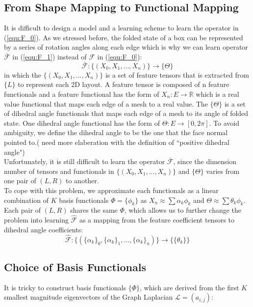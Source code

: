 \subsection{From Shape Mapping to Functional Mapping}
It is difficult to design a model and a learning scheme to learn the operator in (\ref{equ:F_0}). As we stressed before, the folded state of a box can be represented by a series of rotation angles along each edge which is why we can learn operator $\mathcal{\bar{F}}$ in (\ref{equ:F_1}) instead of $\mathcal{F}$ in (\ref{equ:F_0}):
\begin{equation}
\mathcal{\bar{F}}:\{(X_0,X_1,...,X_n)\}\rightarrow\{\Theta\}
\label{equ:F_1}
\end{equation}
in which the $\{(X_0,X_1,...,X_n)\}$ is a set of feature tensors that is extracted from $\{L\}$ to represent each 2D layout. A feature tensor is composed of n feature functionals and a feature functional has the form of $X_n:E\rightarrow\mathbb{R}$ which is a real value functional that maps each edge of a mesh to a real value. The $\{\Theta\}$ is a set of dihedral angle functionals that maps each edge of a mesh to its angle of folded state. One dihedral angle functional has the form of $\Theta:E\rightarrow [0,2\pi]$. To avoid ambiguity, we define the dihedral angle to be the one that the face normal pointed to.({\color{red} {need more elaberation with the definition of ``positive dihedral angle"}})\\
Unfortunately, it is still difficult to learn the operator $\mathcal{\bar{F}}$, since the dimension number of tensors and functionals in $\{(X_0,X_1,...,X_n)\}$ and $\{\Theta\}$ varies from one pair of $(L,R)$ to another.\\
To cope with this problem, we approximate each functionals as a linear combination of $K$ basis functionals $\Phi = \{\phi_k\}$ as $X_n \approx \sum \alpha_k \phi_k$  and $\Theta \approx \sum \theta_k \phi_k$. Each pair of $(L,R)$ shares the same $\Phi$, which allows us to further change the problem into learning $\mathcal{\hat{F}}$ as a mapping from the feature coefficient tensors to dihedral angle coefficients:
\begin{equation}
\mathcal{\hat{F}}:\{(\{\alpha_k\}_0,\{\alpha_k\}_1,...,\{\alpha_k\}_n)\}\rightarrow\{\{\theta_k\}\}
\label{equ:F_2}
\end{equation}
\subsection{Choice of Basis Functionals}
It is tricky to construct basis functionals $\{\Phi\}$, which are derived from the first $K$ smallest magnitude eigenvectors of the Graph Laplacian $\mathcal{L} = (a_{i,j})$:

